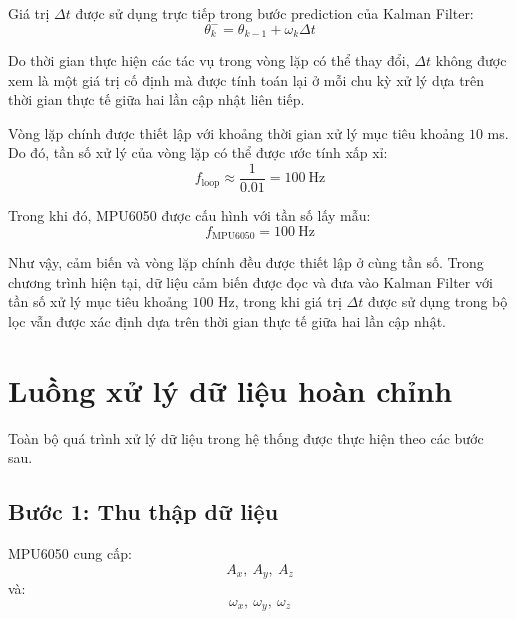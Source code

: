 Giá trị $\Delta t$ được sử dụng trực tiếp trong bước prediction của Kalman Filter:
\begin{equation}
\theta_k^-
=
\theta_{k-1}
+
\omega_k\Delta t
\end{equation}

Do thời gian thực hiện các tác vụ trong vòng lặp có thể thay đổi, $\Delta t$ không được xem là một giá trị cố định mà được tính toán lại ở mỗi chu kỳ xử lý dựa trên thời gian thực tế giữa hai lần cập nhật liên tiếp.

Vòng lặp chính được thiết lập với khoảng thời gian xử lý mục tiêu khoảng $10$ ms. Do đó, tần số xử lý của vòng lặp có thể được ước tính xấp xỉ:
\begin{equation}
f_{\text{loop}}
\approx
\frac{1}{0.01}
= \qty{100}{\hertz}
\end{equation}

Trong khi đó, MPU6050 được cấu hình với tần số lấy mẫu:
\begin{equation}
f_{\text{MPU6050}}=\qty{100}{\hertz}
\end{equation}

Như vậy, cảm biến và vòng lặp chính đều được thiết lập ở cùng tần số. Trong chương trình hiện tại, dữ liệu cảm biến được đọc và đưa vào Kalman Filter với tần số xử lý mục tiêu khoảng $100$ Hz, trong khi giá trị $\Delta t$ được sử dụng trong bộ lọc vẫn được xác định dựa trên thời gian thực tế giữa hai lần cập nhật.


\section{Luồng xử lý dữ liệu hoàn chỉnh}
\label{sec:complete-flow}

Toàn bộ quá trình xử lý dữ liệu trong hệ thống được thực hiện theo các bước sau.

\subsection{Bước 1: Thu thập dữ liệu}

MPU6050 cung cấp:
\begin{equation}
A_x,\ A_y,\ A_z
\end{equation}
và:
\begin{equation}
\omega_x,\ \omega_y,\ \omega_z
\end{equation}

